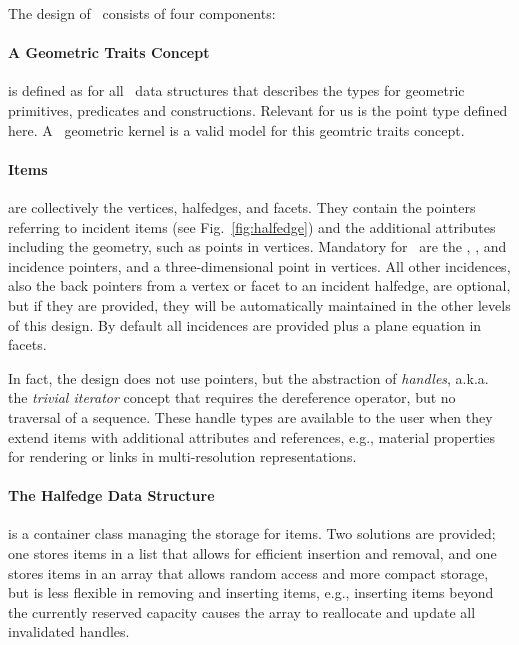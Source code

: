 \label{sec:poly}

The design of \cgalpoly\ consists of four components:

\paragraph*{A Geometric Traits Concept} is defined as for all \cgal\
data structures that describes the types for geometric primitives,
predicates and constructions. Relevant for us is the point type
defined here. A \cgal\ geometric kernel is a valid model for this
geomtric traits concept.

\paragraph*{Items}  are collectively the  vertices, halfedges, and
facets. They contain the pointers referring to incident items (see
Fig.~\ref{fig:halfedge}) and the additional attributes including the
geometry, such as points in vertices. Mandatory for \cgalpoly\ are the
\CodeFmt{next}, \CodeFmt{opposite}, and \CodeFmt{vertex} incidence
pointers, and a three-dimensional point in vertices. All other
incidences, also the back pointers from a vertex or facet to an
incident halfedge, are optional, but if they are provided, they will
be automatically maintained in the other levels of this design. By
default all incidences are provided plus a plane equation in facets.

In fact, the design does not use pointers, but the abstraction of
\emph{handles}, a.k.a. the \emph{trivial iterator\/} concept that
requires the dereference operator, but no traversal of a sequence.
These handle types are available to the user when they extend items
with additional attributes and references, e.g., material properties
for rendering or links in multi-resolution representations.

\paragraph*{The Halfedge Data Structure} is a container class managing
the storage for items. Two solutions are provided; one stores items in
a list that allows for efficient insertion and removal, and one
stores items in an array that allows random access and more compact
storage, but is less flexible in removing and inserting items, e.g.,
inserting items beyond the currently reserved capacity causes the
array to reallocate and update all invalidated handles.


